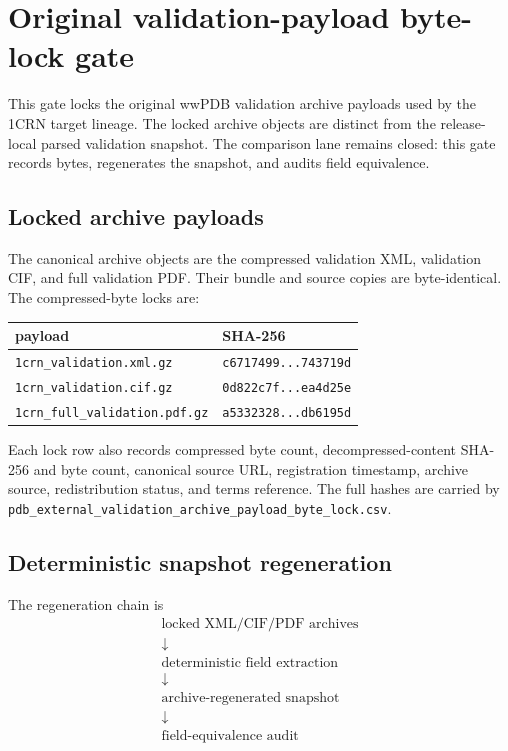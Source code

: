 \section{Original validation-payload byte-lock gate}

This gate locks the original wwPDB validation archive payloads used by the 1CRN target lineage. The locked archive objects are distinct from the release-local parsed validation snapshot. The comparison lane remains closed: this gate records bytes, regenerates the snapshot, and audits field equivalence.

\subsection{Locked archive payloads}

The canonical archive objects are the compressed validation XML, validation CIF, and full validation PDF. Their bundle and source copies are byte-identical. The compressed-byte locks are:

\begin{center}
\begin{tabular}{@{}ll@{}}
\toprule
payload & SHA-256 \\
\midrule
\texttt{1crn\_validation.xml.gz} & \texttt{c6717499...743719d} \\
\texttt{1crn\_validation.cif.gz} & \texttt{0d822c7f...ea4d25e} \\
\texttt{1crn\_full\_validation.pdf.gz} & \texttt{a5332328...db6195d} \\
\bottomrule
\end{tabular}
\end{center}

Each lock row also records compressed byte count, decompressed-content SHA-256 and byte count, canonical source URL, registration timestamp, archive source, redistribution status, and terms reference. The full hashes are carried by
\texttt{pdb\_external\_validation\_archive\_payload\_byte\_lock.csv}.

\subsection{Deterministic snapshot regeneration}

The regeneration chain is
\[
\begin{gathered}
\text{locked XML/CIF/PDF archives} \\
\downarrow \\
\text{deterministic field extraction} \\
\downarrow \\
\text{archive-regenerated snapshot} \\
\downarrow \\
\text{field-equivalence audit}
\end{gathered}
\]

